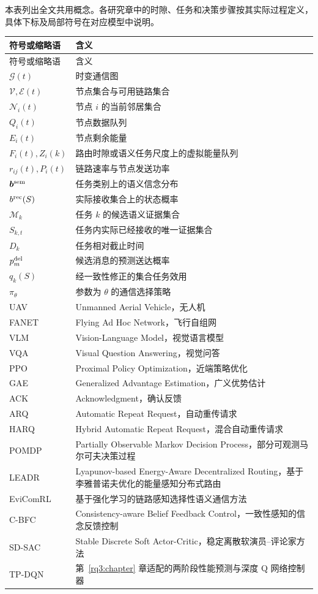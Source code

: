 
\noindent 本表列出全文共用概念。各研究章中的时隙、任务和决策步骤按其实际过程定义，具体下标及局部符号在对应模型中说明。

\begin{longtable}{@{}p{31mm}p{111mm}@{}}
\toprule
符号或缩略语&含义\\
\midrule
\endfirsthead
\toprule 符号或缩略语&含义\\\midrule
\endhead
\bottomrule\endfoot
$\mathcal G(t)$&时变通信图\\
$\mathcal V,\mathcal E(t)$&节点集合与可用链路集合\\
$\mathcal N_i(t)$&节点 $i$ 的当前邻居集合\\
$Q_i(t)$&节点数据队列\\
$E_i(t)$&节点剩余能量\\
$F_i(t),Z_i(k)$&路由时隙或语义任务尺度上的虚拟能量队列\\
$r_{ij}(t),P_i(t)$&链路速率与节点发送功率\\
$\bm b^{\rm sem}$&任务类别上的语义信念分布\\
$b^{\rm rec}(S)$&实际接收集合上的状态概率\\
$\mathcal M_k$&任务 $k$ 的候选语义证据集合\\
$S_{k,t}$&任务内实际已经接收的唯一证据集合\\
$D_k$&任务相对截止时间\\
$p_m^{\rm del}$&候选消息的预测送达概率\\
$q_k(S)$&经一致性修正的集合任务效用\\
$\pi_\theta$&参数为 $\theta$ 的通信选择策略\\
UAV&Unmanned Aerial Vehicle，无人机\\
FANET&Flying Ad Hoc Network，飞行自组网\\
VLM&Vision-Language Model，视觉语言模型\\
VQA&Visual Question Answering，视觉问答\\
PPO&Proximal Policy Optimization，近端策略优化\\
GAE&Generalized Advantage Estimation，广义优势估计\\
ACK&Acknowledgment，确认反馈\\
ARQ&Automatic Repeat Request，自动重传请求\\
HARQ&Hybrid Automatic Repeat Request，混合自动重传请求\\
POMDP&Partially Observable Markov Decision Process，部分可观测马尔可夫决策过程\\
LEADR&Lyapunov-based Energy-Aware Decentralized Routing，基于李雅普诺夫优化的能量感知分布式路由\\
EviComRL&基于强化学习的链路感知选择性语义通信方法\\
C-BFC&Consistency-aware Belief Feedback Control，一致性感知的信念反馈控制\\
SD-SAC&Stable Discrete Soft Actor-Critic，稳定离散软演员--评论家方法\\
TP-DQN&第~\ref{rq3:chapter} 章适配的两阶段性能预测与深度 Q 网络控制器\\
\end{longtable}
